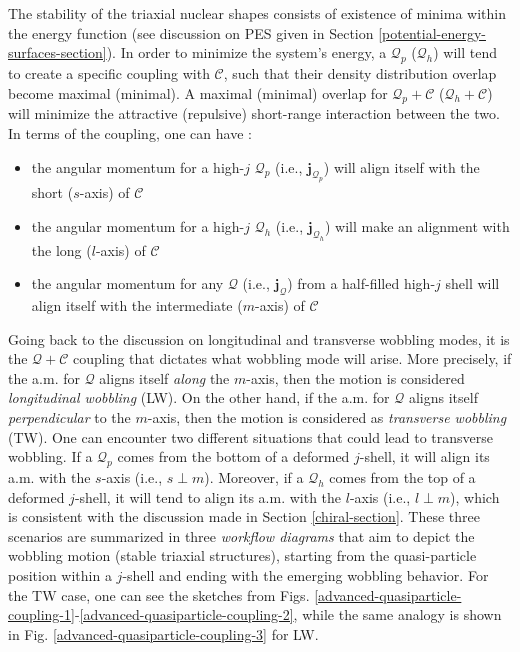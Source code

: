 The stability of the triaxial nuclear shapes consists of existence of minima within the energy function (see discussion on PES given in Section \ref{potential-energy-surfaces-section}). In order to minimize the system's energy, a $\mathcal{Q}_p$ ($\mathcal{Q}_h$) will tend to create a specific coupling with $\mathscr{C}$, such that their density distribution overlap become maximal (minimal). A maximal (minimal) overlap for $\mathcal{Q}_p+\mathscr{C}$ ($\mathcal{Q}_h+\mathscr{C}$) will minimize the attractive (repulsive) short-range interaction between the two. In terms of the coupling, one can have \cite{frauendorf2014transverse}:
\begin{itemize}
    \item the angular momentum for a high-$j$ $\mathcal{Q}_p$ (i.e., $\mathbf{j}_{\mathcal{Q}_p}$) will align itself with the short ($s$-axis) of $\mathscr{C}$ 
    \item the angular momentum for a high-$j$ $\mathcal{Q}_h$ (i.e., $\mathbf{j}_{\mathcal{Q}_h}$) will make an alignment with the long ($l$-axis) of $\mathscr{C}$
    \item the angular momentum for any $\mathcal{Q}$ (i.e., $\mathbf{j}_{\mathcal{Q}}$) from a half-filled high-$j$ shell will align itself with the intermediate ($m$-axis) of $\mathscr{C}$
\end{itemize}
Going back to the discussion on longitudinal and transverse wobbling modes, it is the $\mathcal{Q}+\mathscr{C}$ coupling that dictates what wobbling mode will arise. More precisely, if the a.m. for $\mathcal{Q}$ aligns itself \emph{along} the $m$-axis, then the motion is considered \emph{longitudinal wobbling} (LW). On the other hand, if the a.m. for $\mathcal{Q}$ aligns itself \emph{perpendicular} to the $m$-axis, then the motion is considered as \emph{transverse wobbling} (TW). One can encounter two different situations that could lead to transverse wobbling. If a $\mathcal{Q}_p$ comes from the bottom of a deformed $j$-shell, it will align its a.m. with the $s$-axis (i.e., $s\perp m$). Moreover, if a $\mathcal{Q}_h$ comes from the top of a deformed $j$-shell, it will tend to align its a.m. with the $l$-axis (i.e., $l\perp m$), which is consistent with the discussion made in Section \ref{chiral-section}. These three scenarios are summarized in three \emph{workflow diagrams} that aim to depict the wobbling motion (stable triaxial structures), starting from the quasi-particle position within a $j$-shell and ending with the emerging wobbling behavior. For the TW case, one can see the sketches from Figs. \ref{advanced-quasiparticle-coupling-1}-\ref{advanced-quasiparticle-coupling-2}, while the same analogy is shown in Fig. \ref{advanced-quasiparticle-coupling-3} for LW.
